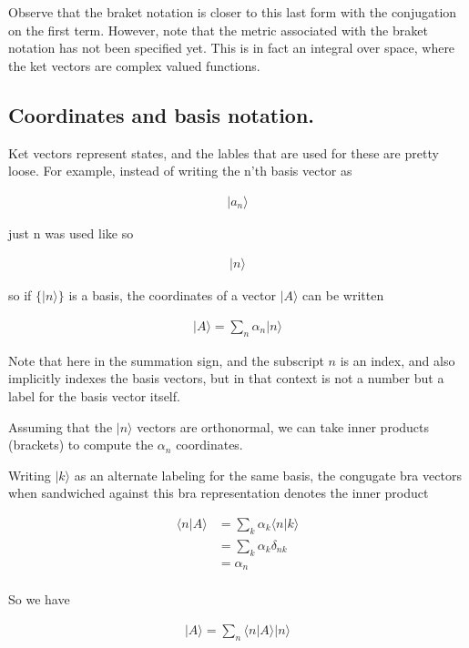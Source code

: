 \documentclass{article}
\newcommand{\ket}[1]{\lvert {#1} \rangle}
\newcommand{\braket}[2]{\langle{#1} \vert {#2}\rangle}
\begin{document}
Observe that the braket notation is closer to this last form with the conjugation on the first term.  However, note that the metric associated with the braket notation has not been specified yet.  This is in fact an integral over space, where the ket vectors are complex valued functions.

\subsection{ Coordinates and basis notation. }

Ket vectors represent states, and the lables that are used for these are pretty loose.  For example, instead
of writing the n'th basis vector as 

\begin{align*}
\ket{a_n}
\end{align*}

just n was used like so

\begin{align*}
\ket{n}
\end{align*}

so if $\{\ket{n}\}$ is a basis, the coordinates of a vector $\ket{A}$ can be written

\begin{align*}
\ket{A} = \sum_n \alpha_n \ket{n}
\end{align*}

Note that here in the summation sign, and the subscript $n$ is an index, and also implicitly indexes the basis vectors, but in that context is not a number but a label for the basis vector itself.

Assuming that the $\ket{n}$ vectors are orthonormal, we can take inner products (brackets) to compute the $\alpha_n$ coordinates.

Writing $\ket{k}$ as an alternate labeling for the same basis, the congugate bra vectors when sandwiched against this bra representation denotes the inner product

\begin{align*}
\braket{n}{A} 
&= \sum_k \alpha_k \braket{n}{k} \\
&= \sum_k \alpha_k \delta_{nk} \\
&= \alpha_n \\
\end{align*}

So we have

\begin{align*}
\ket{A} = \sum_n \braket{n}{A} \ket{n}
\end{align*}
\end{document}
